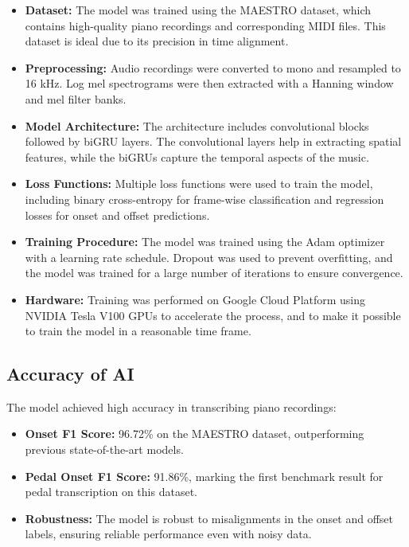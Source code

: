 \documentclass{article}
\begin{document}
\begin{itemize}
    \item \textbf{Dataset:} The model was trained using the MAESTRO dataset, which contains high-quality piano recordings and corresponding MIDI files. This dataset is ideal due to its precision in time alignment.
    \item \textbf{Preprocessing:} Audio recordings were converted to mono and resampled to 16 kHz. Log mel spectrograms were then extracted with a Hanning window and mel filter banks.
    \item \textbf{Model Architecture:} The architecture includes convolutional blocks followed by biGRU layers. The convolutional layers help in extracting spatial features, while the biGRUs capture the temporal aspects of the music.
    \item \textbf{Loss Functions:} Multiple loss functions were used to train the model, including binary cross-entropy for frame-wise classification and regression losses for onset and offset predictions.
    \item \textbf{Training Procedure:} The model was trained using the Adam optimizer with a learning rate schedule. Dropout was used to prevent overfitting, and the model was trained for a large number of iterations to ensure convergence.
    \item \textbf{Hardware:} Training was performed on Google Cloud Platform using NVIDIA Tesla V100 GPUs to accelerate the process, and to make it possible to train the model in a reasonable time frame.
\end{itemize}

\subsection{Accuracy of AI}

The model achieved high accuracy in transcribing piano recordings:
\begin{itemize}
    \item \textbf{Onset F1 Score:} 96.72\% on the MAESTRO dataset, outperforming previous state-of-the-art models.
    \item \textbf{Pedal Onset F1 Score:} 91.86\%, marking the first benchmark result for pedal transcription on this dataset.
    \item \textbf{Robustness:} The model is robust to misalignments in the onset and offset labels, ensuring reliable performance even with noisy data.
\end{itemize}
\end{document}
